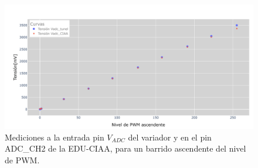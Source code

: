 \begin{figure}[H]
    \centering
    \includegraphics[width=1\linewidth]{Figuras/datalogger/Hardware/MedicionesPWM/pruebaTunelCiaaAsc.png}
    \caption{Mediciones a la entrada pin $V_{ADC}$ del variador y en el pin ADC\_CH2 de la EDU-CIAA, para un barrido ascendente  del nivel de PWM.}
    \label{fig:pruebaTunelCiaaAsc}
\end{figure}

